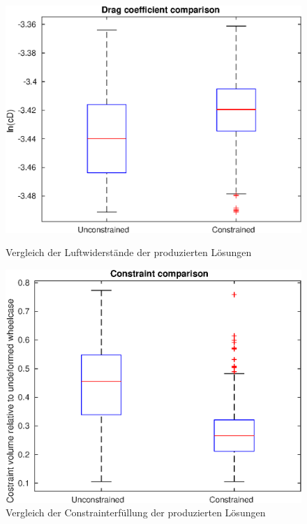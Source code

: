 \begin{figure}[h]
	\centering
	\begin{minipage}{0.45\textwidth}
		\centering
		\includegraphics[width=1\linewidth]{bilder/2pt500Samples/dragBoxplot}
		\caption{Vergleich der Luftwiderstände der produzierten Lösungen}
		\label{fig:1stdragbox}
	\end{minipage}\hfill
	\begin{minipage}{0.45\textwidth}
		\centering
		\includegraphics[width=1\linewidth]{bilder/2pt500Samples/constraintBoxplot}
		\caption{Vergleich der Constrainterfüllung der produzierten Lösungen}
		\label{fig:1stconbox}
	\end{minipage}
\end{figure}

